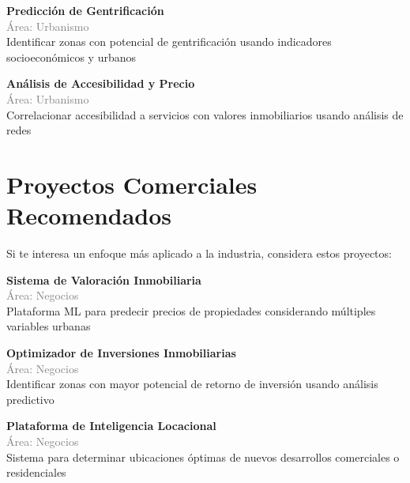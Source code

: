 \documentclass[11pt,a4paper]{article}
\begin{document}
\begin{tcolorbox}[colback=green!5,colframe=darkgreen,title={\small Proyecto Científico \#2}]
\textbf{Predicción de Gentrificación}\\[0.2cm]
\textcolor{gray}{\small Área: Urbanismo}\\[0.2cm]
Identificar zonas con potencial de gentrificación usando indicadores socioeconómicos y urbanos
\end{tcolorbox}


\begin{tcolorbox}[colback=green!5,colframe=darkgreen,title={\small Proyecto Científico \#3}]
\textbf{Análisis de Accesibilidad y Precio}\\[0.2cm]
\textcolor{gray}{\small Área: Urbanismo}\\[0.2cm]
Correlacionar accesibilidad a servicios con valores inmobiliarios usando análisis de redes
\end{tcolorbox}


\section*{ Proyectos Comerciales Recomendados}

Si te interesa un enfoque más aplicado a la industria, considera estos proyectos:


\begin{tcolorbox}[colback=orange!5,colframe=darkorange,title={\small Proyecto Comercial \#1}]
\textbf{Sistema de Valoración Inmobiliaria}\\[0.2cm]
\textcolor{gray}{\small Área: Negocios}\\[0.2cm]
Plataforma ML para predecir precios de propiedades considerando múltiples variables urbanas
\end{tcolorbox}


\begin{tcolorbox}[colback=orange!5,colframe=darkorange,title={\small Proyecto Comercial \#2}]
\textbf{Optimizador de Inversiones Inmobiliarias}\\[0.2cm]
\textcolor{gray}{\small Área: Negocios}\\[0.2cm]
Identificar zonas con mayor potencial de retorno de inversión usando análisis predictivo
\end{tcolorbox}


\begin{tcolorbox}[colback=orange!5,colframe=darkorange,title={\small Proyecto Comercial \#3}]
\textbf{Plataforma de Inteligencia Locacional}\\[0.2cm]
\textcolor{gray}{\small Área: Negocios}\\[0.2cm]
Sistema para determinar ubicaciones óptimas de nuevos desarrollos comerciales o residenciales
\end{tcolorbox}
\end{document}
